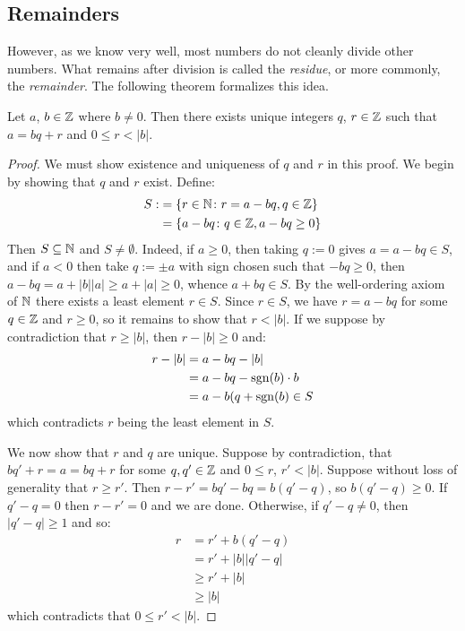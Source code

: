 \subsection{Remainders}

However, as we know very well, most numbers do not cleanly divide other numbers. What remains after division is called the \textit{residue}, or more commonly, the \textit{remainder}. The following theorem formalizes this idea.

\begin{thmbox}
   Let $a$, $b \in \mathbb{Z}$ where $b \neq 0$. Then there exists unique integers $q$, $r \in \mathbb{Z}$ such that $a = bq + r$ and $0 \leq r < |b|$. 
\end{thmbox}
\begin{proof}
   We must show existence and uniqueness of $q$ and $r$ in this proof. We begin by showing that $q$ and $r$ exist. Define:
   \begin{align*}
      S :&= \{r \in \mathbb{N} \colon r =a - bq, q \in \mathbb{Z}\} \\
        &=\{a - bq \colon q \in \mathbb{Z}, a - bq \geq 0\}
   \end{align*}
   Then $S \subseteq \mathbb{N}$ and $S \neq \emptyset$. Indeed, if $a \geq 0$, then taking $q := 0$ gives $a = a - bq \in S$, and if $a < 0$ then take $q := \pm a$ with sign chosen such that $-bq \geq 0$, then $a - bq = a + |b||a| \geq a + |a| \geq 0$, whence $a + bq \in S$.
   By the well-ordering axiom of $\mathbb{N}$ there exists a least element $r \in S$. Since $r \in S$, we have $r = a - bq$ for some $q \in \mathbb{Z}$ and $r \geq 0$, so it remains to show that $r < |b|$. If we suppose by contradiction that $r \geq |b|$, then $r - |b| \geq 0$ and:
   \begin{align*}
      r - |b| &= a - bq- |b| \\ 
              &= a - bq - \operatorname{sgn}(b)\cdot b \\
              &= a - b(q + \operatorname{sgn}(b) \in S
   \end{align*}  
   which contradicts $r$ being the least element in $S$.

   We now show that $r$ and $q$ are unique. Suppose by contradiction, that $bq' + r = a = bq + r$ for some $q, q' \in \mathbb{Z}$ and $0 \leq r$, $r' < |b|$. Suppose without loss of generality that $r \geq r'$. Then $r - r' = bq' - bq = b(q' - q)$, so $b(q' - q) \geq 0$. If $q' - q = 0$ then $r - r' = 0$ and we are done. Otherwise, if $q' - q \neq 0$, then $|q' - q| \geq 1$ and so:
   \begin{align*}
      r &= r' + b(q' -q) \\
        &= r' + |b||q' -q| \\
        &\geq r' +|b| \\
        &\geq |b|
   \end{align*}
   which contradicts that $0 \leq r' < |b|$.
\end{proof}

